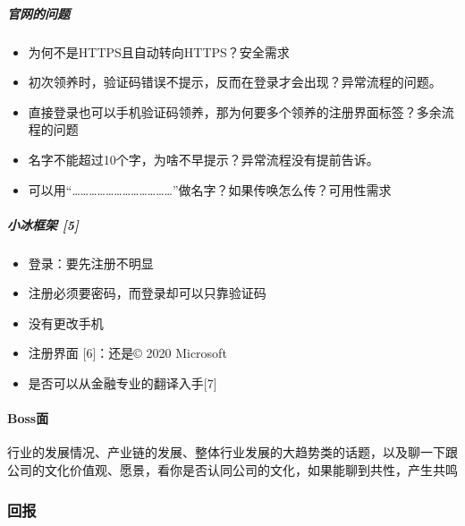 \documentclass[letterpaper,11pt,english]{sphinxmanual}
\begin{document}
\subparagraph{官网的问题}
\label{\detokenize{chapter_interview/simulate_interview:id11}}\begin{itemize}
\item {} 
为何不是HTTPS且自动转向HTTPS？安全需求

\item {} 
初次领养时，验证码错误不提示，反而在登录才会出现？异常流程的问题。

\item {} 
直接登录也可以手机验证码领养，那为何要多个领养的注册界面标签？多余流程的问题

\item {} 
名字不能超过10个字，为啥不早提示？异常流程没有提前告诉。

\item {} 
可以用“………………………………”做名字？如果传唤怎么传？可用性需求

\end{itemize}


\subparagraph{小冰框架 {[}5{]}}
\label{\detokenize{chapter_interview/simulate_interview:id12}}\begin{itemize}
\item {} 
登录：要先注册不明显

\item {} 
注册必须要密码，而登录却可以只靠验证码

\item {} 
没有更改手机

\item {} 
注册界面 {[}6{]}：还是© 2020 Microsoft

\item {} 
是否可以从金融专业的翻译入手{[}7{]}

\end{itemize}


\paragraph{Boss面}
\label{\detokenize{chapter_interview/simulate_interview:boss}}
行业的发展情况、产业链的发展、整体行业发展的大趋势类的话题，以及聊一下跟公司的文化价值观、愿景，看你是否认同公司的文化，如果能聊到共性，产生共鸣%
\begin{footnote}[786]\sphinxAtStartFootnote
{}
%
\end{footnote}


\subsubsection{回报}
\label{\detokenize{chapter_interview/reward:id1}}\label{\detokenize{chapter_interview/reward::doc}}
\end{document}
